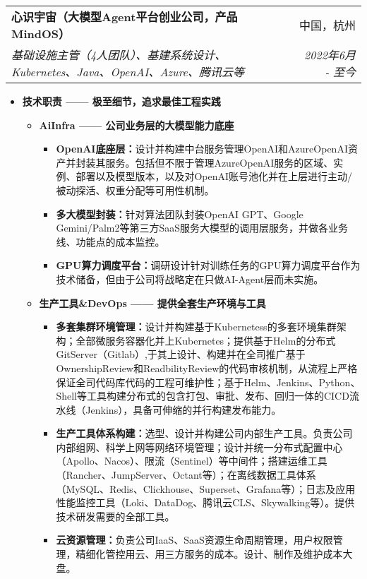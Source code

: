 \documentclass[letterpaper,11pt]{article}
\makeatletter
\newcommand{\resumeSubheading}[4]{
	\vspace{-1pt}\item
	\begin{tabular*}{0.97\textwidth}[t]{l@{\extracolsep{\fill}}r}
		\textbf{#1} & #2 \\
		\textit{\small#3} & \textit{\small #4} \\
	\end{tabular*}\vspace{-5pt}
}
\makeatother
\begin{document}
\begin{spacing}{1.0}
		\resumeSubheading
		{心识宇宙（大模型Agent平台创业公司，产品MindOS）}{中国，杭州}
		{基础设施主管（4人团队）、基建系统设计、Kubernetes、Java、OpenAI、Azure、腾讯云等}{2022年6月 - 至今}
		\begin{itemize}
			\item \textbf{技术职责 —— 极至细节，追求最佳工程实践}
			\begin{itemize}
				\item \textbf{AiInfra —— 公司业务层的大模型能力底座}
				\begin{itemize}
					\item \textbf{OpenAI底座层：}设计并构建中台服务管理OpenAI和AzureOpenAI资产并封装其服务。包括但不限于管理AzureOpenAI服务的区域、实例、部署以及模型版本，以及对OpenAI账号池化并在上层进行主动/被动探活、权重分配等可用性机制。
					\item \textbf{多大模型封装：}针对算法团队封装OpenAI GPT、Google Gemini/Palm2等第三方SaaS服务大模型的调用层服务，并做各业务线、功能点的成本监控。
					\item \textbf{GPU算力调度平台：}调研设计针对训练任务的GPU算力调度平台作为技术储备，但由于公司将战略定在只做AI-Agent层而未实施。
				\end{itemize}
				
				\item \textbf{生产工具\&DevOps —— 提供全套生产环境与工具}
				\begin{itemize}
					\item \textbf{多套集群环境管理：}设计并构建基于Kubernetess的多套环境集群架构；全部微服务容器化并上Kubernetes；提供基于Helm的分布式GitServer（Gitlab）,于其上设计、构建并在全司推广基于OwnershipReview和ReadbilityReview的代码审核机制，从流程上严格保证全司代码库代码的工程可维护性；基于Helm、Jenkins、Python、Shell等工具构建分布式的包含打包、审批、发布、回归一体的CICD流水线（Jenkins），具备可伸缩的并行构建发布能力。
					\item \textbf{生产工具体系构建：}选型、设计并构建公司内部生产工具。负责公司内部组网、科学上网等网络环境管理；设计并统一分布式配置中心（Apollo、Nacos）、限流（Sentinel）等中间件；搭建运维工具（Rancher、JumpServer、Octant等）；在离线数据工具体系（MySQL、Redis、Clickhouse、Superset、Grafana等）；日志及应用性能监控工具（Loki、DataDog、腾讯云CLS、Skywalking等）。提供技术研发需要的全部工具。
					\item \textbf{云资源管理：}负责公司IaaS、SaaS资源生命周期管理，用户权限管理，精细化管控用云、用三方服务的成本。设计、制作及维护成本大盘。
				\end{itemize}
				

\end{itemize}
\end{itemize}
\end{spacing}
\end{document}
